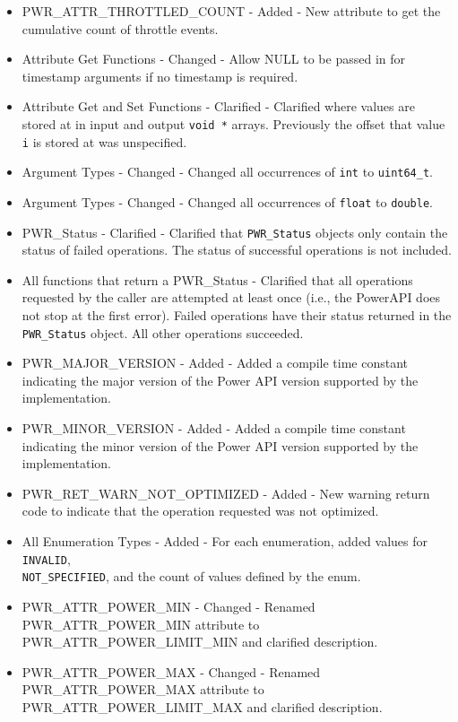 \begin{itemize}
    \item{PWR_ATTR_THROTTLED_COUNT - Added - New attribute to get the cumulative count of throttle events.}
    \item{Attribute Get Functions - Changed - Allow NULL to be passed in for timestamp arguments if no timestamp is required.}
    \item{Attribute Get and Set Functions - Clarified - Clarified where values are stored at in input and output \texttt{void *} arrays. Previously the offset that value \texttt{i} is stored at was unspecified.}
    \item{Argument Types - Changed - Changed all occurrences of \texttt{int} to \texttt{uint64_t}.}
    \item{Argument Types - Changed - Changed all occurrences of \texttt{float} to \texttt{double}.}
    \item{PWR_Status - Clarified - Clarified that \texttt{PWR_Status} objects only contain the status of failed operations. The status of successful operations is not included.}
    \item{All functions that return a PWR_Status - Clarified that all operations requested by the caller are attempted at least once (i.e., the PowerAPI does not stop at the first error). Failed operations have their status returned in the \texttt{PWR_Status} object. All other operations succeeded.}
    \item{PWR_MAJOR_VERSION - Added - Added a compile time constant indicating the major version of the Power API version supported by the implementation.}
    \item{PWR_MINOR_VERSION - Added - Added a compile time constant indicating the minor version of the Power API version supported by the implementation.}
    \item{PWR_RET_WARN_NOT_OPTIMIZED - Added - New warning return code to indicate that the operation requested was not optimized.}
    \item{All Enumeration Types - Added - For each enumeration, added values for \texttt{INVALID},\\
    \texttt{NOT_SPECIFIED}, and the count of values defined by the enum.}
    \item{PWR_ATTR_POWER_MIN - Changed - Renamed PWR_ATTR_POWER_MIN attribute to PWR_ATTR_POWER_LIMIT_MIN and clarified description.}
    \item{PWR_ATTR_POWER_MAX - Changed - Renamed PWR_ATTR_POWER_MAX attribute to PWR_ATTR_POWER_LIMIT_MAX and clarified description.}
\end{itemize}

